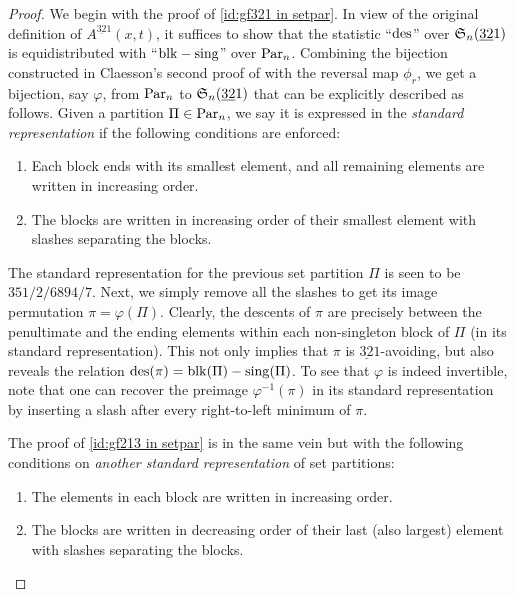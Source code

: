 \begin{proof}
We begin with the proof of \eqref{id:gf321 in setpar}. In view of the original definition of $A^{\underline{32}1}(x,t)$, it suffices to show that the statistic ``$\des$'' over $\S_n(\underline{32}1)$ is equidistributed with ``$\blk -\sing$'' over $\Par_n$. Combining the bijection constructed in Claesson's second proof of \cite[Prop.\ 2]{cla01} with the reversal map $\phi_r$, we get a bijection, say $\varphi$, from $\Par_n$ to $\S_n(\underline{32}1)$ that can be explicitly described as follows. Given a partition $\Pi\in\Par_n$, we say it is expressed in the \textit{standard representation} if the following conditions are enforced:
\begin{enumerate}[label=(\roman*)]
    \item Each block ends with its smallest element, and all remaining elements are written in increasing order.
    \item The blocks are written in increasing order of their smallest element with slashes separating the blocks.
\end{enumerate}
The standard representation for the previous set partition $\Pi$ is seen to be $351/2/6894/7$. Next, we simply remove all the slashes to get its image permutation $\pi=\varphi(\Pi)$. Clearly, the descents of $\pi$ are precisely between the penultimate and the ending elements within each non-singleton block of $\Pi$ (in its standard representation). This not only implies that $\pi$ is $\underline{32}1$-avoiding, but also reveals the relation $\des(\pi)=\blk(\Pi)-\sing(\Pi)$. To see that $\varphi$ is indeed invertible, note that one can recover the preimage $\varphi^{-1}(\pi)$ in its standard representation by inserting a slash after every right-to-left minimum of $\pi$. 

The proof of \eqref{id:gf213 in setpar} is in the same vein but with the following conditions on \textit{another standard representation} of set partitions:
\begin{enumerate}[label=(\roman*)]
    \item The elements in each block are written in increasing order.
    \item The blocks are written in decreasing order of their last (also largest) element with slashes separating the blocks. \qedhere
\end{enumerate}
\end{proof}

